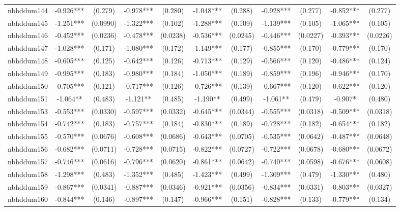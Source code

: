 \documentclass[]{article}
\begin{document}
\begin{tabular}{lcccccccccc}
nbhddum144 & -0.926*** & (0.279) & -0.978*** & (0.280) & -1.048*** & (0.288) & -0.928*** & (0.277) & -0.852*** & (0.277) \\
nbhddum145 & -1.251*** & (0.0990) & -1.322*** & (0.102) & -1.288*** & (0.109) & -1.139*** & (0.105) & -1.065*** & (0.105) \\
nbhddum146 & -0.452*** & (0.0236) & -0.478*** & (0.0238) & -0.536*** & (0.0245) & -0.446*** & (0.0227) & -0.393*** & (0.0226) \\
nbhddum147 & -1.028*** & (0.171) & -1.080*** & (0.172) & -1.149*** & (0.177) & -0.855*** & (0.170) & -0.779*** & (0.170) \\
nbhddum148 & -0.605*** & (0.125) & -0.642*** & (0.126) & -0.713*** & (0.129) & -0.566*** & (0.120) & -0.486*** & (0.124) \\
nbhddum149 & -0.995*** & (0.183) & -0.980*** & (0.184) & -1.050*** & (0.189) & -0.859*** & (0.196) & -0.946*** & (0.170) \\
nbhddum150 & -0.705*** & (0.121) & -0.717*** & (0.126) & -0.726*** & (0.139) & -0.667*** & (0.120) & -0.622*** & (0.120) \\
nbhddum151 & -1.064** & (0.483) & -1.121** & (0.485) & -1.190** & (0.499) & -1.061** & (0.479) & -0.907* & (0.480) \\
nbhddum153 & -0.553*** & (0.0330) & -0.597*** & (0.0332) & -0.645*** & (0.0344) & -0.555*** & (0.0318) & -0.509*** & (0.0318) \\
nbhddum154 & -0.742*** & (0.183) & -0.757*** & (0.184) & -0.830*** & (0.189) & -0.728*** & (0.182) & -0.654*** & (0.182) \\
nbhddum155 & -0.570*** & (0.0676) & -0.608*** & (0.0686) & -0.643*** & (0.0705) & -0.535*** & (0.0642) & -0.487*** & (0.0648) \\
nbhddum156 & -0.682*** & (0.0711) & -0.728*** & (0.0715) & -0.822*** & (0.0727) & -0.722*** & (0.0678) & -0.680*** & (0.0672) \\
nbhddum157 & -0.746*** & (0.0616) & -0.796*** & (0.0620) & -0.861*** & (0.0642) & -0.740*** & (0.0598) & -0.676*** & (0.0608) \\
nbhddum158 & -1.298*** & (0.483) & -1.352*** & (0.485) & -1.423*** & (0.499) & -1.309*** & (0.479) & -1.330*** & (0.480) \\
nbhddum159 & -0.867*** & (0.0341) & -0.887*** & (0.0346) & -0.921*** & (0.0356) & -0.834*** & (0.0331) & -0.803*** & (0.0327) \\
nbhddum160 & -0.844*** & (0.146) & -0.897*** & (0.147) & -0.966*** & (0.151) & -0.828*** & (0.133) & -0.779*** & (0.134) \\

\end{tabular}
\end{document}
